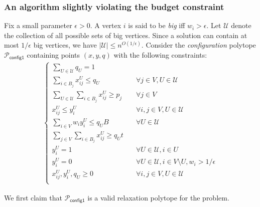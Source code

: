 \documentclass[a4paper,11pt]{article}
\newcommand{\U}{\mathcal{U}}
\renewcommand{\P}{\mathcal{P}}
\begin{document}
\subsubsection{An algorithm slightly violating the budget constraint}
Fix a small parameter $\epsilon > 0$. A vertex $i$ is said to be \emph{big} iff $w_i > \epsilon$. Let $\U$ denote the collection of all possible sets of big vertices. Since a solution can contain at most $1/\epsilon$ big vertices, we have $|\U| \leq n^{O(1/\epsilon)}$. Consider the \emph{configuration} polytope $\P_\textsf{config1}$ containing points $(x,y,q)$ with the following constraints:
\begin{align*}
  \begin{cases}
      \sum_{U \in \U}q_U = 1     & \quad \\
      \sum_{i \in B_j} x^{U}_{ij} \leq q_U    & \quad \forall j \in V, U \in \U \\
      \sum_{U \in \U} \sum_{i \in B_j} x^{U}_{ij} \geq p_j    & \quad \forall j \in V \\
       x^{U}_{ij} \leq y^{U}_i   & \quad \forall i,j \in V, U \in \U\\
       \sum_{i \in V} w_i y^{U}_i \leq q_U B   & \quad  \forall U \in \U \\
       \sum_{j \in V} \sum_{i \in B_j} x^{U}_{ij} \geq q_U t   & \quad \\
       y^{U}_i = 1 & \quad \forall U \in \U, i \in U\\
       y^{U}_i = 0 & \quad \forall U \in \U, i \in V \setminus U, w_i > 1/\epsilon \\
       x^{U}_{ij}, y^{U}_i, q_U \geq 0   & \quad \forall i,j \in V, U \in \U \\
  \end{cases}
\end{align*}

We first claim that $\P_\textsf{config1}$ is a valid relaxation polytope for the problem.
\end{document}

